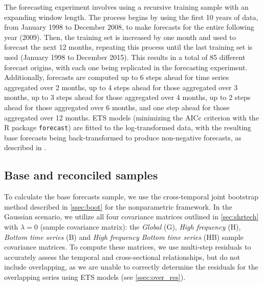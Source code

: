 \documentclass[a4paper,11pt]{article}
\theoremstyle{definition}
\begin{document}
The forecasting experiment involves using a recursive training sample with an expanding window length. The process begins by using the first 10 years of data, from January 1998 to December 2008, to make forecasts for the entire following year (2009). Then, the training set is increased by one month and used to forecast the next 12 months, repeating this process until the last training set is used (January 1998 to December 2015). This results in a total of 85 different forecast origins, with each one being replicated in the forecasting experiment. Additionally, forecasts are computed up to 6 steps ahead for time series aggregated over 2 months, up to 4 steps ahead for those aggregated over 3 months, up to 3 steps ahead for those aggregated over 4 months, up to 2 steps ahead for those aggregated over 6 months, and one step ahead for those aggregated over 12 months. ETS models (minimizing the AICc criterion with the \textsf{R} package \texttt{forecast}) are fitted to the log-transformed data, with the resulting base forecasts being back-transformed to produce non-negative forecasts, as described in \cite{wickramasuriya2020}.

\subsection{Base and reconciled samples}\label{ssec:vn_br}

To calculate the base forecasts sample, we use the cross-temporal joint bootstrap method described in \autoref{ssec:boot} for the nonparametric framework. In the Gaussian scenario, we utilize all four covariance matrices outlined in \autoref{sec:shrtech} with $\lambda=0$ (sample covariance matrix): the \textit{Global} (G), \textit{High frequency} (H), \textit{Bottom time series} (B) and \textit{High frequency Bottom time series} (HB) sample covariance matrices. To compute these matrices, we use multi-step residuals to accurately assess the temporal and cross-sectional relationships, but do not include overlapping, as we are unable to correctly determine the residuals for the overlapping series using ETS models (see \autoref{ssec:over_res}).
\end{document}
